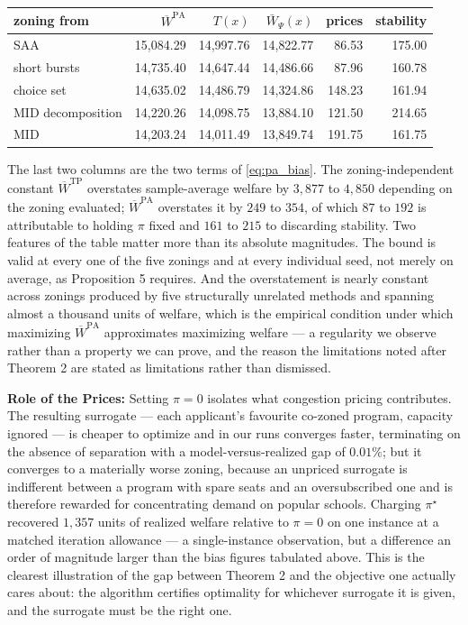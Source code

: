 \documentclass{article}
\begin{document}
\begin{center}
\begin{tabular}{lrrrrr}
\hline
zoning from & $\overline{W}^{\mathrm{PA}}$ & $T(x)$ & $\bar{W}_\Psi(x)$ & prices & stability \\
\hline
SAA               & 15{,}084.29 & 14{,}997.76 & 14{,}822.77 &  86.53 & 175.00 \\
short bursts      & 14{,}735.40 & 14{,}647.44 & 14{,}486.66 &  87.96 & 160.78 \\
choice set        & 14{,}635.02 & 14{,}486.79 & 14{,}324.86 & 148.23 & 161.94 \\
MID decomposition & 14{,}220.26 & 14{,}098.75 & 13{,}884.10 & 121.50 & 214.65 \\
MID               & 14{,}203.24 & 14{,}011.49 & 13{,}849.74 & 191.75 & 161.75 \\
\hline
\end{tabular}
\end{center}

The last two columns are the two terms of \eqref{eq:pa_bias}. The zoning-independent constant $\overline{W}^{\mathrm{TP}}$ overstates sample-average welfare by $3{,}877$ to $4{,}850$ depending on the zoning evaluated; $\overline{W}^{\mathrm{PA}}$ overstates it by $249$ to $354$, of which $87$ to $192$ is attributable to holding $\pi$ fixed and $161$ to $215$ to discarding stability. Two features of the table matter more than its absolute magnitudes. The bound is valid at every one of the five zonings and at every individual seed, not merely on average, as Proposition 5 requires. And the overstatement is nearly constant across zonings produced by five structurally unrelated methods and spanning almost a thousand units of welfare, which is the empirical condition under which maximizing $\overline{W}^{\mathrm{PA}}$ approximates maximizing welfare --- a regularity we observe rather than a property we can prove, and the reason the limitations noted after Theorem 2 are stated as limitations rather than dismissed.

\noindent\textbf{Role of the Prices:}
Setting $\pi = 0$ isolates what congestion pricing contributes. The resulting surrogate --- each applicant's favourite co-zoned program, capacity ignored --- is cheaper to optimize and in our runs converges faster, terminating on the absence of separation with a model-versus-realized gap of $0.01\%$; but it converges to a materially worse zoning, because an unpriced surrogate is indifferent between a program with spare seats and an oversubscribed one and is therefore rewarded for concentrating demand on popular schools. Charging $\pi^\star$ recovered $1{,}357$ units of realized welfare relative to $\pi = 0$ on one instance at a matched iteration allowance --- a single-instance observation, but a difference an order of magnitude larger than the bias figures tabulated above. This is the clearest illustration of the gap between Theorem 2 and the objective one actually cares about: the algorithm certifies optimality for whichever surrogate it is given, and the surrogate must be the right one.
\end{document}
